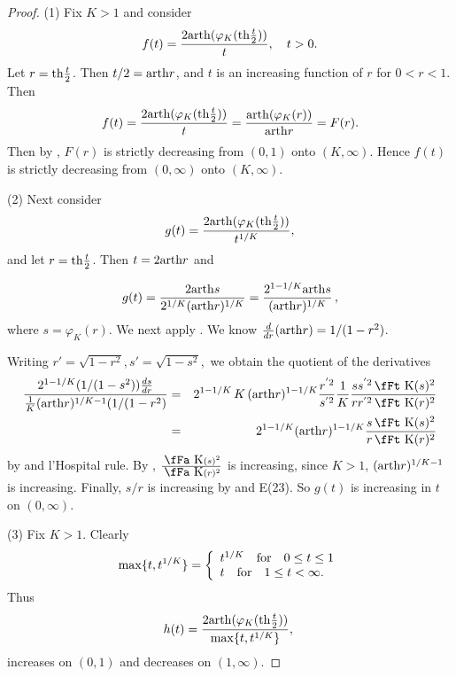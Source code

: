 \documentclass[12pt,a4paper,leqno]{amsart}
\theoremstyle{plain}
\numberwithin{equation}{section}          %
\def\K{\mathchoice
{\hbox{\,\fFt K}}
{\hbox{\,\fFt K}}
{\hbox{\,\fFa K}}
{\hbox{\,\fFp K}}}
\begin{document}
\begin{proof} (1) Fix $K>1$ and consider
$$f(t)=\frac{2{\rm arth}(\varphi_K({\rm th}\frac{t}{2}))}{t},\quad t>0.$$  %
Let $r={\rm th}\frac{t}{2}$. Then $ t/2={\rm arth}r$, and $t$
is an increasing function of $r$ for $0<r<1$. Then
$$f(t)=\frac{2{\rm arth}(\varphi_K({\rm th}\frac{t}{2}))}{t}=\frac{{\rm arth}(\varphi_K(r))}{{\rm arth}r}=F(r).$$
Then by \cite[Theorem 10.9(3)]{avvb}, $F(r)$ is strictly decreasing
from $(0,1)$ onto $(K,\infty)$. Hence $f(t)$ is strictly decreasing
from $(0,\infty)$ onto $(K,\infty)$.


(2) Next consider
$$g(t)=\frac{2{\rm arth}(\varphi_K({\rm th}\frac{t}{2}))}{t^{1/K}},$$
and let $r={\rm th}\frac{t}{2}$. Then $t=2{\rm arth}r$ and

$$g(t)=\frac{2{\rm arth}s}{2^{1/K}({\rm arth}r)^{1/K}}=
\frac{2^{1-1/K}{\rm arth}s}{({\rm arth}r)^{1/K}}\,
,$$ where
$s=\varphi_K(r)$. We next apply \cite[Theorem 1.25]{avvb}. We know
$\frac{d}{dr}({\rm arth}r)=1/(1-r^2)$.

Writing $r'=\sqrt{1-r^2}, s'=\sqrt{1-s^2},$ we obtain the quotient of the derivatives
\begin{eqnarray*}
\frac{2^{1-1/K}(1/(1-s^2))\frac{ds}{dr}}{\frac{1}{K}({\rm arth}r)^{1/K-1}(1/(1-r^2)}&=&
 2^{1-1/K}\, K \,({\rm arth}r)^{ 1-1/K}\frac{r^{'2}}{s^{'2}}\frac{1}{K}\frac{ss^{'2}\K(s)^2}{rr^{'2}\K(r)^2}\\
&=& 2^{1-1/K}({\rm arth}r)^{1-1/K}\frac{s\K(s)^2}{r\K(r)^2}
\end{eqnarray*}
by \cite[appendix E(23)]{avvb} and l'Hospital rule. By \cite[Lemma
10.7(3)]{avvb}, $\frac{\K(s)^2}{\K(r)^2}$ is increasing, since $K>1$,
$({\rm arth}r)^{1/K-1}$ is increasing. Finally, $s/r$ is increasing
by \cite[Theorem 1.25]{avvb} and E(23). So $g(t)$ is increasing in
$t$ on $(0,\infty)$.

(3) Fix $K>1$. Clearly
$$\max\{t,t^{1/K}\}=\left\{\begin{array}{lll} t^{1/K}\quad {\rm for}\quad 0\leq t\leq 1\\
t\quad {\rm for} \quad 1\leq t < \infty .\end{array}\right.$$
\noindent
Thus
$$h(t)=\frac{2{\rm arth}(\varphi_K({\rm th}\frac{t}{2}))}{\max\{t,t^{1/K}\}},\;  $$
increases on $(0,1)$ and decreases on $(1,\infty)$.
\end{proof}

\bigskip
\end{document}
